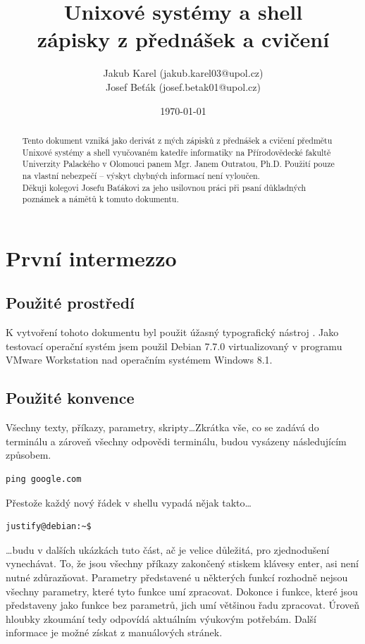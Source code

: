 \documentclass{article}
\title{\Huge{Unixové systémy a shell}\\ \vspace{1em} \normalsize{zápisky z přednášek a cvičení}}
\author{
	\normalsize Jakub Karel (jakub.karel03@upol.cz) \\
	\normalsize Josef Beťák (josef.betak01@upol.cz)}
\date{\today}
\begin{document}
\maketitle

\begin{abstract}
Tento dokument vzniká jako derivát z mých zápisků z přednášek a cvičení předmětu Unixové systémy a shell vyučovaném katedře informatiky na Přírodovědecké fakultě Univerzity Palackého v Olomouci panem Mgr. Janem Outratou, Ph.D. Použití pouze na vlastní nebezpečí -- výskyt chybných informací není vyloučen.\\
Děkuji kolegovi Josefu Baťákovi za jeho usilovnou práci při psaní důkladných poznámek a námětů k tomuto dokumentu.
\end{abstract}

\thispagestyle{empty}
\newpage
\thispagestyle{empty}
\tableofcontents
\thispagestyle{empty}
\newpage

\setcounter{page}{1}
\section{První intermezzo}
\subsection{Použité prostředí}
K vytvoření tohoto dokumentu byl použit úžasný typografický nástroj \LaTeXe. Jako testovací operační systém jsem použil Debian 7.7.0 virtualizovaný v programu VMware Workstation nad operačním systémem Windows 8.1.

\subsection{Použité konvence}
Všechny texty, příkazy, parametry, skripty\dots Zkrátka vše, co se zadává do terminálu a zároveň všechny odpovědi terminálu, budou vysázeny následujícím způsobem. 
\begin{verbatim}
ping google.com
\end{verbatim}
Přestože každý nový řádek v shellu vypadá nějak takto\dots
\begin{verbatim}
justify@debian:~$ 
\end{verbatim}
\dots budu v dalších ukázkách tuto část, ač je velice důležitá, pro zjednodušení vynechávat. To, že jsou všechny příkazy zakončený stiskem klávesy enter, asi není nutné zdůrazňovat. Parametry představené u některých funkcí rozhodně nejsou všechny parametry, které tyto funkce umí zpracovat. Dokonce i funkce, které jsou představeny jako funkce bez parametrů, jich umí většinou řadu zpracovat. Úroveň hloubky zkoumání tedy odpovídá aktuálním výukovým potřebám. Další informace je možné získat z manuálových stránek.
\end{document}
